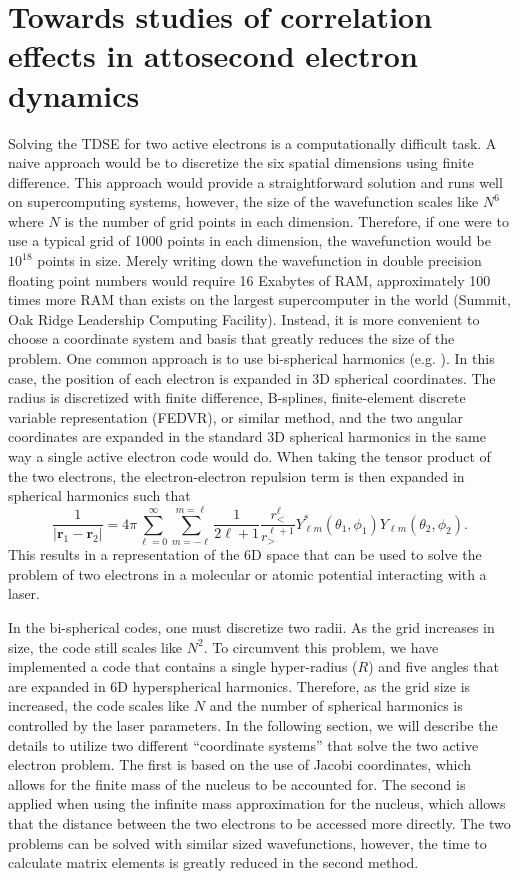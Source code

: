 \chapter{Towards studies of correlation effects in attosecond electron dynamics} %
\label{cha:electron_correlation}


Solving the TDSE for two active electrons is a computationally difficult task. A naive approach would be to discretize the six spatial dimensions using finite difference. This approach would provide a straightforward solution and runs well on supercomputing systems, however, the size of the wavefunction scales like $N^6$ where $N$ is the number of grid points in each dimension. Therefore, if one were to use a typical grid of 1000 points in each dimension, the wavefunction would be $10^{18}$ points in size. Merely writing down the wavefunction in double precision floating point numbers would require 16 Exabytes of RAM, approximately 100 times more RAM than exists on the largest supercomputer in the world (Summit, Oak Ridge Leadership Computing Facility). Instead, it is more convenient to choose a coordinate system and basis that greatly reduces the size of the problem. One common approach is to use bi-spherical harmonics (e.g. \cite{vanroose2006}). In this case, the position of each electron is expanded in 3D spherical coordinates. The radius is discretized with finite difference, B-splines, finite-element discrete variable representation (FEDVR), or similar method, and the two angular coordinates are expanded in the standard 3D spherical harmonics in the same way a single active electron code would do. When taking the tensor product of the two electrons, the electron-electron repulsion term is then expanded in spherical harmonics such that
\begin{equation}
    \frac{1}{|\mathbf{r}_1-\mathbf{r}_2|}= 4\pi \sum_{\ell=0}^\infty \sum_{m=-\ell}^{m=\ell}\frac{1}{2\ell+1}\frac{r_<^\ell}{r_>^{\ell+1}}Y_{\ell m}^*(\theta_1, \phi_1)Y_{\ell m}(\theta_2, \phi_2).
\end{equation}
This results in a representation of the 6D space that can be used to solve the problem of two electrons in a molecular or atomic potential interacting with a laser.

In the bi-spherical codes, one must discretize two radii. As the grid increases in size, the code still scales like $N^2$. To circumvent this problem, we have implemented a code that contains a single hyper-radius ($R$) and five angles that are expanded in 6D hyperspherical harmonics. Therefore, as the grid size is increased, the code scales like $N$ and the number of spherical harmonics is controlled by the laser parameters. In the following section, we will describe the details to utilize two different ``coordinate systems'' that solve the two active electron problem. The first is based on the use of Jacobi coordinates, which allows for the finite mass of the nucleus to be accounted for. The second is applied when using the infinite mass approximation for the nucleus, which allows that the distance between the two electrons to be accessed more directly. The two problems can be solved with similar sized wavefunctions, however, the time to calculate matrix elements is greatly reduced in the second method. 

